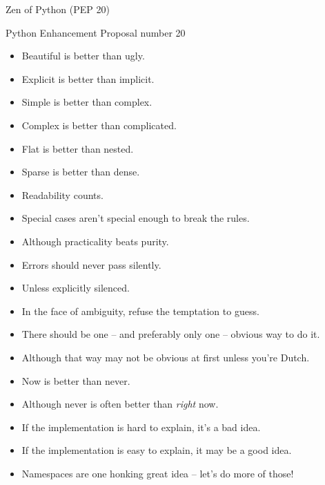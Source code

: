 \documentclass[ignorenonframetext,]{beamer}
\begin{document}
\begin{frame}{Zen of Python (PEP 20)}

    Python Enhancement Proposal number 20

    \begin{itemize}
        \item<1-1> Beautiful is better than ugly.
        \item<1-2> Explicit is better than implicit.
        \item<1-2> Simple is better than complex.
        \item<1-1> Complex is better than complicated.
        \item<1-1> Flat is better than nested.
        \item<1-1> Sparse is better than dense.
        \item<1-2> Readability counts.
        \item<1-1> Special cases aren't special enough to break the rules.
        \item<1-1> Although practicality beats purity.
        \item<1-2> Errors should never pass silently.
        \item<1-1> Unless explicitly silenced.
        \item<1-1> In the face of ambiguity, refuse the temptation to guess.
        \item<1-2> There should be one -- and preferably only one -- obvious way to do it.
        \item<1-1> Although that way may not be obvious at first unless you're Dutch.
        \item<1-1> Now is better than never.
        \item<1-1> Although never is often better than \emph{right} now.
        \item<1-2> If the implementation is hard to explain, it's a bad idea.
        \item<1-1> If the implementation is easy to explain, it may be a good idea.
        \item<1-2> Namespaces are one honking great idea -- let's do more of those!
    \end{itemize}
\end{frame}
\end{document}
